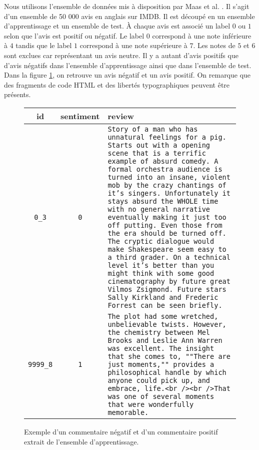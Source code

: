 \documentclass{article}
\begin{document}

Nous utilisons l'ensemble de données mis à disposition par Maas et al. \cite{maas-EtAl:2011:ACL-HLT2011}. Il s'agit d'un ensemble de 50 000 avis en anglais sur IMDB. Il est découpé en un ensemble d'apprentissage et un ensemble de test. À chaque avis est associé un label $0$ ou $1$ selon que l'avis est positif ou négatif. Le label $0$ correspond à une note inférieure à $4$ tandis que le label $1$ correspond à une note supérieure à $7$. Les notes de $5$ et $6$ sont exclues car représentant un avis neutre. Il y a autant d'avis positifs que d'avis négatifs dans l'ensemble d'apprentissage ainsi que dans l'ensemble de test. Dans la figure \ref{example_imdb}, on retrouve un avis négatif et un avis positif. On remarque que des fragments de code HTML et des libertés typographiques peuvent être présents.

\begin{figure}
\begin{center}
\begin{tabular}{|c|c|p{80mm}|}
	\hline
	id & sentiment & review \\
	\hline
	\texttt{0\_3} & \texttt{0} & \texttt{Story of a man who has unnatural feelings for a pig. Starts out with a opening scene that is a terrific example of absurd comedy. A formal orchestra audience is turned into an insane, violent mob by the crazy chantings of it's singers. Unfortunately it stays absurd the WHOLE time with no general narrative eventually making it just too off putting. Even those from the era should be turned off. The cryptic dialogue would make Shakespeare seem easy to a third grader. On a technical level it's better than you might think with some good cinematography by future great Vilmos Zsigmond. Future stars Sally Kirkland and Frederic Forrest can be seen briefly.} \\
	\hline
	\texttt{9999\_8} & \texttt{1} & \texttt{The plot had some wretched, unbelievable twists. However, the chemistry between Mel Brooks and Leslie Ann Warren was excellent. The insight that she comes to, ""There are just moments,"" provides a philosophical handle by which anyone could pick up, and embrace, life.<br /><br />That was one of several moments that were wonderfully memorable.} \\
	\hline
\end{tabular}
\caption{Exemple d'un commentaire négatif et d'un commentaire positif extrait de l'ensemble d'apprentissage.}
\label{example_imdb}
\end{center}
\end{figure}
\end{document}
